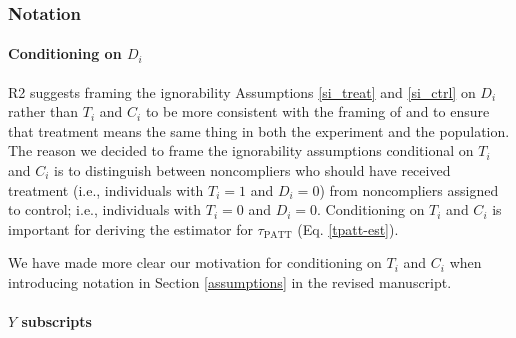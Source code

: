 \documentclass[hidelinks,12pt,letterpaper]{article}
\begin{document}
\subsubsection{Notation}

\paragraph{Conditioning on $D_i$}

R2 suggests framing the ignorability Assumptions \ref{si_treat} and \ref{si_ctrl} on $D_i$ rather than $T_i$ and $C_i$ to be more consistent with the framing of \citet{Hartman} and to ensure that treatment means the same thing in both the experiment and the population. The reason we decided to frame the ignorability assumptions conditional on $T_i$ and $C_i$ is to distinguish between noncompliers who should have received treatment (i.e., individuals with $T_i=1$ and $D_i = 0$) from noncompliers assigned to control; i.e., individuals with $T_i = 0$ and $D_i = 0$. Conditioning on $T_i$ and $C_i$ is important for deriving the estimator for $\tau_{\text{PATT}}$ (Eq. \ref{tpatt-est}). 

We have made more clear our motivation for conditioning on  $T_i$ and $C_i$ when introducing notation in Section \ref{assumptions} in the revised manuscript. 

\paragraph{$Y$ subscripts}
\end{document}
